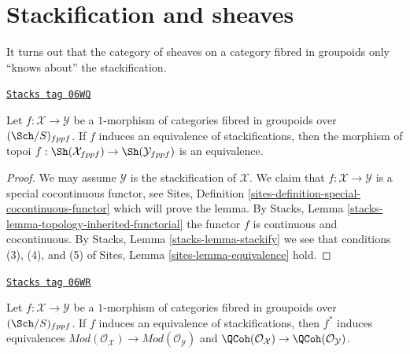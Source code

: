 \section{Stackification and sheaves}
\label{stacks-sheaves-section-stackification}
It turns out that the category of sheaves on a category fibred in
groupoids only ``knows about'' the stackification.

\begin{lemma}[Stackification]
\label{stacks-sheaves-lemma-stackification}
\href{https://stacks.math.columbia.edu/tag/06WQ}{\texttt{Stacks tag 06WQ}}

Let $f : \mathcal{X} \to \mathcal{Y}$ be a $1$-morphism of categories
fibred in groupoids over $(\Sch/S)_{fppf}$. If
$f$ induces an equivalence of stackifications, then the morphism
of topoi
$f : \Sh(\mathcal{X}_{fppf}) \to \Sh(\mathcal{Y}_{fppf})$
is an equivalence.
\end{lemma}

\begin{proof}
We may assume $\mathcal{Y}$ is the stackification of $\mathcal{X}$.
We claim that $f : \mathcal{X} \to \mathcal{Y}$ is a special cocontinuous
functor, see
Sites, Definition \ref{sites-definition-special-cocontinuous-functor}
which will prove the lemma. By
Stacks, Lemma \ref{stacks-lemma-topology-inherited-functorial}
the functor $f$ is continuous and cocontinuous. By
Stacks, Lemma \ref{stacks-lemma-stackify}
we see that conditions (3), (4), and (5) of
Sites, Lemma \ref{sites-lemma-equivalence}
hold.
\end{proof}

\begin{lemma}
\label{stacks-sheaves-lemma-stackification-quasi-coherent}
\href{https://stacks.math.columbia.edu/tag/06WR}{\texttt{Stacks tag 06WR}}

Let $f : \mathcal{X} \to \mathcal{Y}$ be a $1$-morphism of categories
fibred in groupoids over $(\Sch/S)_{fppf}$. If
$f$ induces an equivalence of stackifications, then $f^*$
induces equivalences
$\textit{Mod}(\mathcal{O}_\mathcal{X}) \to
\textit{Mod}(\mathcal{O}_\mathcal{Y})$
and
$\QCoh(\mathcal{O}_\mathcal{X}) \to
\QCoh(\mathcal{O}_\mathcal{Y})$.
\end{lemma}


